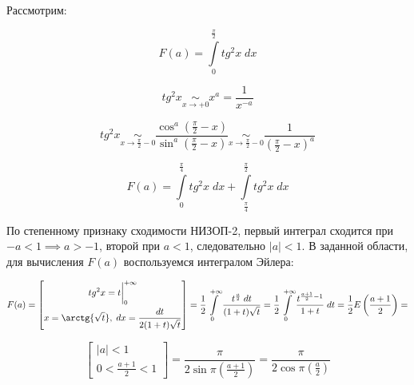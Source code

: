 \documentclass[../../main.tex]{subfiles}
\begin{document}
\begin{example}
	Рассмотрим:
	
	\[  F(a) = \int\limits_{0}^{\frac{\pi}{2}} tg^2 x \; dx      \]
	
	\[ tg^2 x  {\underset{x \to +0}\sim} x^a = \frac{1}{x^{-a}}\]
		
	\[ tg^2 x {\underset{x \to \frac{\pi}{2} - 0}\sim} \frac{\cos^a \left( \frac{\pi}{2} - x\right) }{\sin^a \left( \frac{\pi}{2} - x\right)} {\underset{x \to \frac{\pi}{2} - 0}\sim} \frac{1}{\left( \frac{\pi}{2} - x\right)^a } \]
	
	\[  F(a) = \int\limits_{0}^{\frac{\pi}{4}} tg^2 x \; dx + \int\limits_{\frac{\pi}{4}}^{\frac{\pi}{2}} tg^2 x \; dx     \]
	
	По степенному признаку сходимости НИЗОП-2, первый интеграл сходится при $-a < 1 \implies a > -1$, второй при $a < 1$, следовательно $|a| < 1$. В заданной области, для вычисления $F(a)$ воспользуемся интегралом Эйлера:
	
	\[  F(a) = \left[ \begin{gathered}   
	tg^2 x  = t \bigg|_{0}^{+\infty}\\
	x = \arctg{\sqrt{t}}, \; dx = \frac{dt}{2(1+t)\sqrt{t}}
	\end{gathered}\right] = \frac{1}{2} \int\limits_{0}^{+\infty} \frac{ t^{\frac{a}{2}}  \; dt}{(1+t)\sqrt{t}} = \frac{1}{2} \int\limits_{0}^{+\infty} \frac{t^{\frac{a+1}{2} - 1} }{1+t} \; dt = \frac{1}{2}E\left( \frac{a+1}{2} \right) =        \]
	
	\[  \left[ \begin{gathered}   
	|a|<1\\
	0 < \frac{a+1}{2} < 1
	\end{gathered}\right] = \frac{\pi}{2\sin{\pi\left( \frac{a+1}{2}\right) }} =  \frac{\pi}{2\cos{\pi\left( \frac{a}{2}\right) }}       \]
	
\end{example}	
\end{document}
